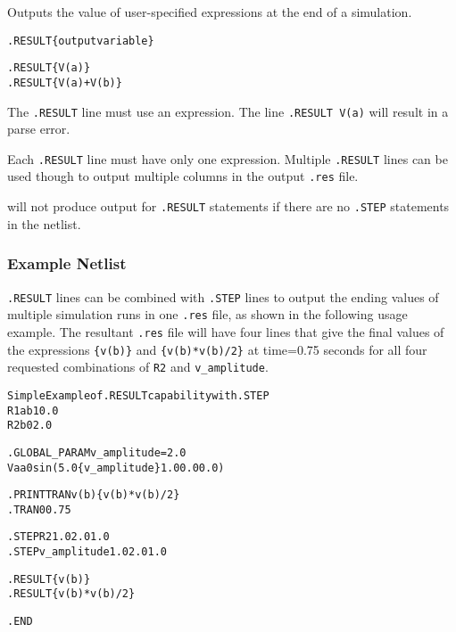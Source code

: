 


Outputs the value of user-specified expressions at the end of a simulation.

\begin{Command}

\format
\begin{alltt}
.RESULT \{output variable\}
\end{alltt}

\examples
\begin{alltt}
.RESULT \{V(a)\}
.RESULT \{V(a)+V(b)\}
\end{alltt}

\comments
The \texttt{.RESULT} line must use an expression.  The line \texttt{.RESULT V(a)} will result in a parse
error.

Each \texttt{.RESULT} line must have only one expression.  Multiple \texttt{.RESULT} lines can be
used though to output multiple columns in the output \texttt{.res} file.

\Xyce{} will not produce output for \texttt{.RESULT} statements if there are 
no \texttt{.STEP} statements in the netlist.   

\end{Command}

\subsubsection{Example Netlist}
\texttt{.RESULT} lines can be combined with \texttt{.STEP} lines to output the ending values of
multiple simulation runs in one \texttt{.res} file, as shown in the following usage example. The 
resultant \texttt{.res} file will have four lines that give the final values of the expressions
\texttt{\{v(b)\}} and \texttt{\{v(b)*v(b)/2\}} at time=0.75 seconds for all four requested 
combinations of \texttt{R2} and \texttt{v\_amplitude}. 
\begin{alltt}
Simple Example of .RESULT capability with .STEP
R1 a b 10.0
R2 b 0 2.0

.GLOBAL_PARAM  v_amplitude=2.0
Va a 0 sin (5.0 \{v_amplitude\} 1.0 0.0 0.0)

.PRINT TRAN v(b) \{v(b)*v(b)/2\}
.TRAN 0 0.75

.STEP R2 1.0 2.0 1.0 
.STEP v_amplitude 1.0 2.0 1.0

.RESULT \{v(b)\} 
.RESULT \{v(b)*v(b)/2\}

.END
\end{alltt}
